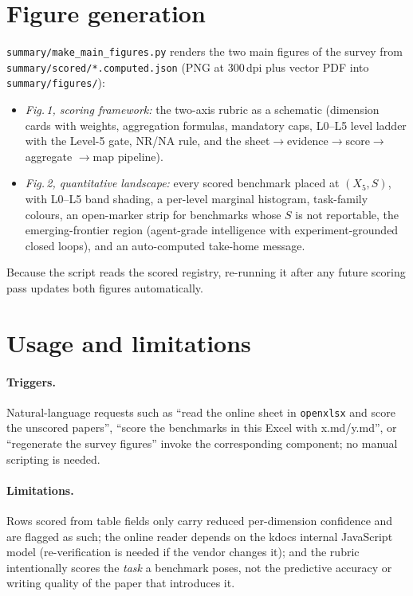 \documentclass[11pt,a4paper]{article}
\begin{document}
\section{Figure generation}
\texttt{summary/make\_main\_figures.py} renders the two main figures of the
survey from \texttt{summary/scored/*.computed.json} (PNG at 300\,dpi plus
vector PDF into \texttt{summary/figures/}):
\begin{itemize}[leftmargin=1.6em,itemsep=1pt,topsep=2pt]
  \item \emph{Fig.\,1, scoring framework:} the two-axis rubric as a schematic
    (dimension cards with weights, aggregation formulas, mandatory caps,
    L0--L5 level ladder with the Level-5 gate, NR/NA rule, and the
    sheet$\rightarrow$evidence$\rightarrow$score$\rightarrow$aggregate
    $\rightarrow$map pipeline).
  \item \emph{Fig.\,2, quantitative landscape:} every scored benchmark placed
    at $(X_5, S)$, with L0--L5 band shading, a per-level marginal histogram,
    task-family colours, an open-marker strip for benchmarks whose $S$ is not
    reportable, the emerging-frontier region (agent-grade intelligence with
    experiment-grounded closed loops), and an auto-computed take-home message.
\end{itemize}
Because the script reads the scored registry, re-running it after any future
scoring pass updates both figures automatically.

\section{Usage and limitations}
\paragraph{Triggers.} Natural-language requests such as ``read the online
sheet in \texttt{openxlsx} and score the unscored papers'', ``score the
benchmarks in this Excel with x.md/y.md'', or ``regenerate the survey
figures'' invoke the corresponding component; no manual scripting is needed.

\paragraph{Limitations.} Rows scored from table fields only carry reduced
per-dimension confidence and are flagged as such; the online reader depends
on the kdocs internal JavaScript model (re-verification is needed if the
vendor changes it); and the rubric intentionally scores the \emph{task} a
benchmark poses, not the predictive accuracy or writing quality of the paper
that introduces it.
\end{document}
